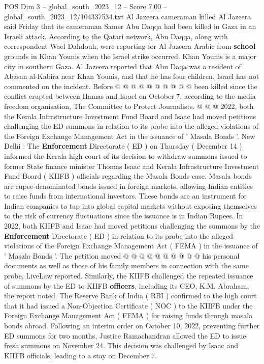 \begin{textsample}{POS Dim 3 – global\_south\_2023\_12 – Score 7.00 – global\_south\_2023\_12/104337534.txt}
Al Jazeera cameraman killed Al Jazeera said Friday that its cameraman Samer Abu Daqqa had been killed in Gaza in an Israeli attack.
According to the Qatari network, Abu Daqqa, along with correspondent Wael Dahdouh, were reporting for Al Jazeera Arabic from \textbf{school} grounds in Khan Younis when the Israel strike occurred.
Khan Younis is a major city in southern Gaza.
Al Jazeera reported that Abu Daqa was a resident of Abasan al-Kabira near Khan Younis, and that he has four children.
Israel has not commented on the incident.
Before @ @ @ @ @ @ @ @ @ @ been killed since the conflict erupted between Hamas and Israel on October 7, according to the media freedom organisation, The Committee to Protect Journalists. @ @ @ 2022, both the Kerala Infrastructure Investment Fund Board and Isaac had moved petitions challenging the ED summons in relation to its probe into the alleged violations of the Foreign Exchange Management Act in the issuance of ' Masala Bonds '.
New Delhi : The \textbf{Enforcement} Directorate ( ED ) on Thursday ( December 14 ) informed the Kerala high court of its decision to withdraw summons issued to former State finance minister Thomas Isaac and Kerala Infrastructure Investment Fund Board ( KIIFB ) officials regarding the Masala Bonds case.
Masala bonds are rupee-denominated bonds issued in foreign markets, allowing Indian entities to raise funds from international investors.
These bonds are an instrument for Indian companies to tap into global capital markets without exposing themselves to the risk of currency fluctuations since the issuance is in Indian Rupees.
In 2022, both KIIFB and Isaac had moved petitions challenging the summons by the \textbf{Enforcement} Directorate ( ED ) in relation to its probe into the alleged violations of the Foreign Exchange Management Act ( FEMA ) in the issuance of ' Masala Bonds '.
The petition moved @ @ @ @ @ @ @ @ @ @ his personal documents as well as those of his family members in connection with the same probe, LiveLaw reported.
Similarly, the KIIFB challenged the repeated issuance of summons by the ED to KIIFB \textbf{officers}, including its CEO, K.M.
Abraham, the report noted.
The Reserve Bank of India ( RBI ) confirmed to the high court that it had issued a Non-Objection Certificate ( NOC ) to the KIIFB under the Foreign Exchange Management Act ( FEMA ) for raising funds through masala bonds abroad.
Following an interim order on October 10, 2022, preventing further ED summons for two months, Justice Ramachandran allowed the ED to issue fresh summons on November 24.
This decision was challenged by Isaac and KIIFB officials, leading to a stay on December 7.

\end{textsample}
